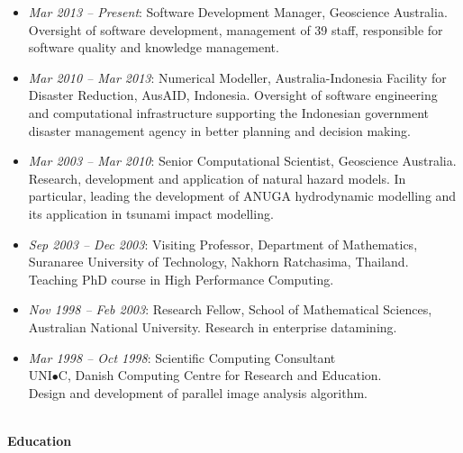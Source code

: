 \documentclass[11pt,a4paper]{article}
\begin{document}
\begin{itemize}
\item {\em Mar 2013 -- Present}: Software Development Manager, Geoscience Australia.
      Oversight of software development, management of 39 staff, responsible for software quality and knowledge management.
\item {\em Mar 2010 -- Mar 2013}: Numerical Modeller, Australia-Indonesia Facility for Disaster Reduction, AusAID, Indonesia.
      Oversight of software engineering and computational infrastructure supporting the Indonesian government disaster management agency in better planning and decision making.
\item {\em Mar 2003 -- Mar 2010}: Senior Computational Scientist, Geoscience Australia.
      Research, development and application of natural hazard models. In particular, leading the development of ANUGA hydrodynamic modelling and its application in tsunami impact modelling.
\item {\em Sep 2003 -- Dec 2003}: Visiting Professor,
      Department of Mathematics,
      Suranaree University of Technology, Nakhorn Ratchasima, Thailand. Teaching PhD course in
      High Performance Computing.
\item {\em Nov 1998 -- Feb 2003}: Research Fellow,
      School of Mathematical Sciences, Australian National University.
      Research in enterprise datamining.
\item {\em Mar 1998 -- Oct 1998}: Scientific Computing Consultant \\
      UNI$\bullet$C, Danish Computing Centre for Research and Education.\\
      Design and development of parallel image analysis algorithm.
\end{itemize}


\pagebreak
\begin{center}
  \hrulefill \\
  {\bf Education} \\[-0.2cm]
  \hrulefill
\end{center}
\end{document}
